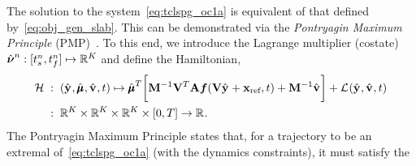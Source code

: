 The solution to the system~\eqref{eq:tclspg_oc1a} is equivalent of that defined by~\eqref{eq:obj_gen_slab}. 
This can be demonstrated via the \textit{Pontryagin Maximum Principle} (PMP)~\cite{optimal_control_book}. To this end, we introduce the Lagrange multiplier (costate) 
$\adjointOCArgnt{n}: [\timeStartArg{n},\timeEndArg{n}] \mapsto \RR{\romdim}$ and define the Hamiltonian, 
\begin{equation}\label{eq:hamiltonian}
\begin{split}
\hamiltonian \; &: \;  (\genstateyDiscreteArgnt{},\adjointDiscreteDumArgnt{},\controllerDiscreteDumArgnt{},t) \mapsto 
 \adjointDiscreteDumArgnt{T} \bigg[  \mass^{-1}\basisspace^T \stweightingMatArgt{n}{t}\velocity(\basisspace \genstateyDiscreteArgnt{} + \stateIntercept,t) + \mass^{-1}\controllerDiscreteDumArgnt{} \bigg] +  \objectiveControlArg{}(\genstateyDiscreteArgnt{},\controllerDiscreteDumArgnt{},t) \\
&: \; \RR{\romdim} \times \RR{\romdim} \times \RR{\romdim} \times [0,T] \rightarrow \RR{}.
\end{split}
\end{equation} 
The Pontryagin Maximum Principle states that, for a trajectory to be an extremal of~\eqref{eq:tclspg_oc1a} (with the dynamics constraints), it must satisfy the 
